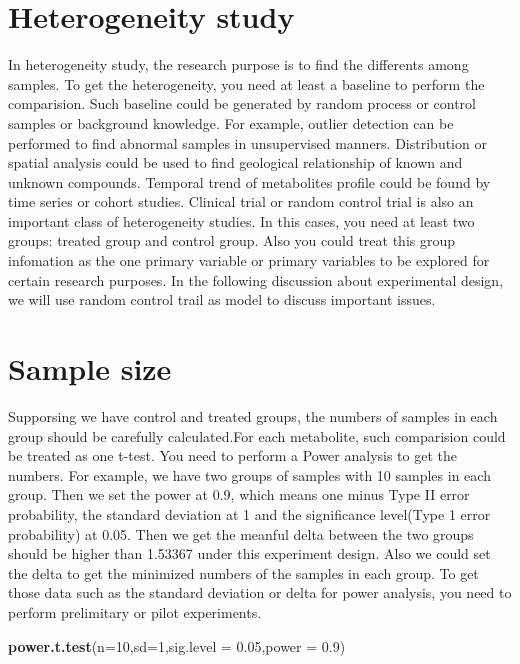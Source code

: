 \documentclass[
]{book}
\newenvironment{Shaded}{\begin{snugshade}}{\end{snugshade}}
\newcommand{\DataTypeTok}[1]{\textcolor[rgb]{0.13,0.29,0.53}{#1}}
\newcommand{\DecValTok}[1]{\textcolor[rgb]{0.00,0.00,0.81}{#1}}
\newcommand{\FloatTok}[1]{\textcolor[rgb]{0.00,0.00,0.81}{#1}}
\newcommand{\KeywordTok}[1]{\textcolor[rgb]{0.13,0.29,0.53}{\textbf{#1}}}
\newcommand{\NormalTok}[1]{#1}
\begin{document}
\hypertarget{heterogeneity-study}{%
\section{Heterogeneity study}\label{heterogeneity-study}}

In heterogeneity study, the research purpose is to find the differents among samples. To get the heterogeneity, you need at least a baseline to perform the comparision. Such baseline could be generated by random process or control samples or background knowledge. For example, outlier detection can be performed to find abnormal samples in unsupervised manners. Distribution or spatial analysis could be used to find geological relationship of known and unknown compounds. Temporal trend of metabolites profile could be found by time series or cohort studies. Clinical trial or random control trial is also an important class of heterogeneity studies. In this cases, you need at least two groups: treated group and control group. Also you could treat this group infomation as the one primary variable or primary variables to be explored for certain research purposes. In the following discussion about experimental design, we will use random control trail as model to discuss important issues.

\hypertarget{sample-size}{%
\section{Sample size}\label{sample-size}}

Supporsing we have control and treated groups, the numbers of samples in each group should be carefully calculated.For each metabolite, such comparision could be treated as one t-test. You need to perform a Power analysis to get the numbers. For example, we have two groups of samples with 10 samples in each group. Then we set the power at 0.9, which means one minus Type II error probability, the standard deviation at 1 and the significance level(Type 1 error probability) at 0.05. Then we get the meanful delta between the two groups should be higher than 1.53367 under this experiment design. Also we could set the delta to get the minimized numbers of the samples in each group. To get those data such as the standard deviation or delta for power analysis, you need to perform prelimitary or pilot experiments.

\begin{Shaded}
\begin{Highlighting}[]
\KeywordTok{power.t.test}\NormalTok{(}\DataTypeTok{n=}\DecValTok{10}\NormalTok{,}\DataTypeTok{sd=}\DecValTok{1}\NormalTok{,}\DataTypeTok{sig.level =} \FloatTok{0.05}\NormalTok{,}\DataTypeTok{power =} \FloatTok{0.9}\NormalTok{)}
\end{Highlighting}
\end{Shaded}
\end{document}
